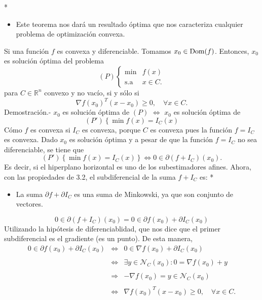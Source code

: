 \begin{paracol}{2}
\switchcolumn[1]*{\noindent\scriptsize
    \begin{itemize}
	\item Este teorema nos dará un resultado óptima que nos caracteriza cualquier problema de optimización convexa.
    \end{itemize}
}
\switchcolumn[0]\noindent
\begin{teo} Si una función $f$ es convexa y diferenciable. Tomamos $x_0\in \mathop{\mbox{\normalfont Dom}}\nolimits(f)$. Entonces, $x_0$ es solución óptima del problema
    $$
    (P)
    \left\{
    \begin{array}{rl}
	\min & f(x)\\
	\text{s.a} & x\in C.
    \end{array}
    \right.
    $$
    para $C\in \mathbb{R}^n$ convexo y no vacío, si y sólo si 
    $$\nabla f(x_0)^T(x-x_0)\geq 0,\quad \forall x\in C.$$
	Demostración.-\; $x_0$ es solución óptima de $(P)$ $\iff$ $x_0$ es solución óptima de 
	$$\left(P'\right)\left\{\min f(x)=I_C(x)\right.$$
	Cómo $f$ es convexa si $I_C$ es convexa, porque $C$ es convexa pues la función $f=I_C$ es convexa. Dado $x_0$ es solución óptima y a pesar de que la función $f=I_C$ no sea diferenciable, se tiene que
	$$\left(P'\right) \left\{\min f(x)=I_C(x)\right\} \iff 0\in \partial(f+I_C)(x_0).$$
	Es decir, si el hiperplano horizontal es uno de los subestimadores afines. Ahora, con las propiedades de 3.2, el subdiferencial de la suma $f+I_C$ es:
\switchcolumn[1]*{\noindent\scriptsize
    \begin{itemize}
	\item La suma $\partial f + \partial I_C$ es una suma de Minkowski, ya que son conjunto de vectores.
    \end{itemize}
}
\switchcolumn[0]\noindent
	$$0\in \partial(f+I_C)(x_0) = 0\in \partial f(x_0) + \partial I_C(x_0)$$
	Utilizando la hipótesis de diferenciablidad, que nos dice que el primer subdiferencial es el gradiente (es un punto). De esta manera,
	$$
	\begin{array}{rcl}
	    0\in \partial f(x_0) + \partial I_C(x_0) &\iff& 0\in \nabla f(x_0) + \partial I_C(x_0)\\\\
						     &\iff& \exists y \in \mathcal{N}_C(x_0): 0=\nabla f(x_0) + y\\\\
						     &\Longrightarrow& -\nabla f(x_0)=y \in \mathcal{N}_C(x_0)\\\\
						     &\iff& \nabla f(x_0)^T(x-x_0)\geq 0,\quad \forall x\in C.
	\end{array}
	$$
\end{teo}


\end{paracol}
